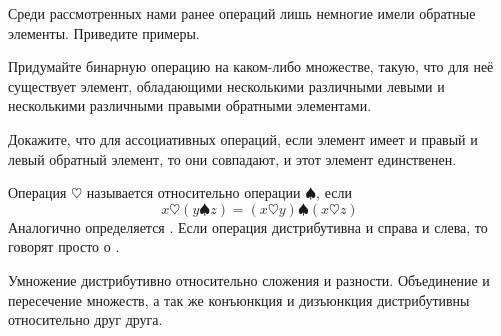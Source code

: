 \begin{exercise}
Среди рассмотренных нами ранее операций лишь немногие имели обратные элементы. Приведите примеры.
\end{exercise}

\begin{exercise}
Придумайте бинарную операцию на каком-либо множестве, такую, что для неё существует элемент, обладающими несколькими различными левыми и несколькими различными правыми обратными элементами.
\end{exercise}

\begin{exercise}
Докажите, что для ассоциативных операций, если элемент имеет и правый и левый обратный элемент, то они совпадают, и этот элемент единственен.
\end{exercise}

\begin{definition}
Операция $\heartsuit$ называется  относительно операции $\spadesuit$, если
$$x\heartsuit (y\spadesuit z) = (x\heartsuit y) \spadesuit (x \heartsuit z)$$
Аналогично определяется . Если операция дистрибутивна и справа и слева, то говорят просто о .
\end{definition}

\begin{example}
Умножение дистрибутивно относительно сложения и разности. Объединение и пересечение множеств, а так же конъюнкция и дизъюнкция дистрибутивны относительно друг друга.
\end{example}